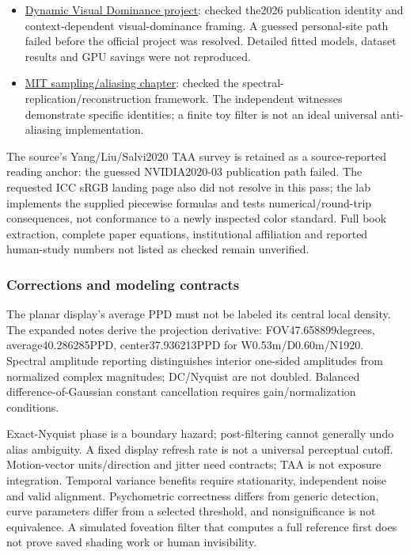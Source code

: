 \begin{itemize}
\item
  \href{https://dynamicvisualdominance.mpi-inf.mpg.de/}{Dynamic Visual Dominance project}: checked the2026 publication identity and context-dependent visual-dominance framing. A guessed personal-site path failed before the official project was resolved. Detailed fitted models, dataset results and GPU savings were not reproduced.
\item
  \href{https://visionbook.mit.edu/sampling_and_aliasing.html}{MIT sampling/aliasing chapter}: checked the spectral-replication/reconstruction framework. The independent witnesses demonstrate specific identities; a finite toy filter is not an ideal universal anti-aliasing implementation.
\end{itemize}

The source's Yang/Liu/Salvi2020 TAA survey is retained as a source-reported reading anchor: the guessed NVIDIA2020-03 publication path failed. The requested ICC sRGB landing page also did not resolve in this pass; the lab implements the supplied piecewise formulas and tests numerical/round-trip consequences, not conformance to a newly inspected color standard. Full book extraction, complete paper equations, institutional affiliation and reported human-study numbers not listed as checked remain unverified.

\subsubsection{Corrections and modeling contracts}\label{appendix-a103e7846d21-corrections-and-modeling-contracts}

The planar display's average PPD must not be labeled its central local density. The expanded notes derive the projection derivative: FOV47.658899degrees, average40.286285PPD, center37.936213PPD for W0.53m/D0.60m/N1920. Spectral amplitude reporting distinguishes interior one-sided amplitudes from normalized complex magnitudes; DC/Nyquist are not doubled. Balanced difference-of-Gaussian constant cancellation requires gain/normalization conditions.

Exact-Nyquist phase is a boundary hazard; post-filtering cannot generally undo alias ambiguity. A fixed display refresh rate is not a universal perceptual cutoff. Motion-vector units/direction and jitter need contracts; TAA is not exposure integration. Temporal variance benefits require stationarity, independent noise and valid alignment. Psychometric correctness differs from generic detection, curve parameters differ from a selected threshold, and nonsignificance is not equivalence. A simulated foveation filter that computes a full reference first does not prove saved shading work or human invisibility.

